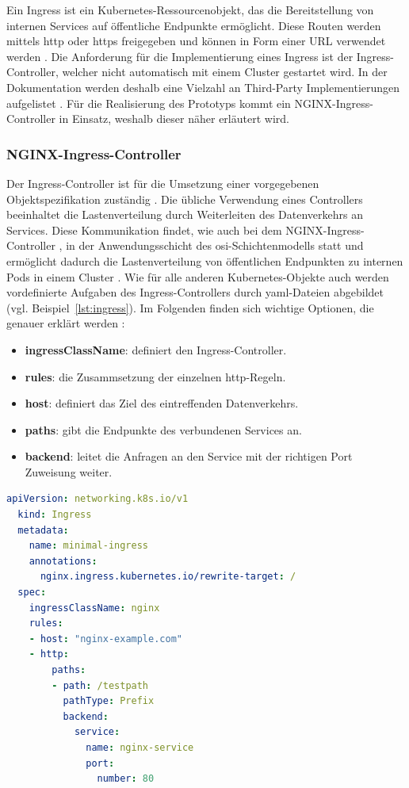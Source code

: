 Ein Ingress ist ein Kubernetes-Ressourcenobjekt, das die Bereitstellung von internen Services auf öffentliche Endpunkte ermöglicht.
Diese Routen werden mittels \acs{http} oder \acs{https} freigegeben und können in Form einer URL verwendet werden \cite{kubernetesingress}.
Die Anforderung für die Implementierung eines Ingress ist der Ingress-Controller, welcher nicht automatisch mit einem Cluster gestartet wird. 
In der Dokumentation werden deshalb eine Vielzahl an Third-Party Implementierungen aufgelistet \cite{kubernetesingresscontroller}. 
Für die Realisierung des Prototyps kommt ein NGINX-Ingress-Controller in Einsatz, weshalb dieser näher erläutert wird.

\subsubsection{NGINX-Ingress-Controller}
Der Ingress-Controller ist für die Umsetzung einer vorgegebenen Objektspezifikation zuständig \cite{kubernetesingress}.
Die übliche Verwendung eines Controllers beeinhaltet die Lastenverteilung durch Weiterleiten des Datenverkehrs an Services. 
Diese Kommunikation findet, wie auch bei dem NGINX-Ingress-Controller \cite{kubernetesingresscontrollerlayer}, in der Anwendungsschicht des \acs{osi}-Schichtenmodells statt und ermöglicht dadurch die 
Lastenverteilung von öffentlichen Endpunkten zu internen Pods in einem Cluster \cite{kubernetesingressibm}.
Wie für alle anderen Kubernetes-Objekte auch werden vordefinierte Aufgaben des Ingress-Controllers durch \acs{yaml}-Dateien abgebildet (vgl. Beispiel~\ref{lst:ingress}).
Im Folgenden finden sich wichtige Optionen, die genauer erklärt werden \cite{kubernetesingress}:

\begin{itemize}
  \item \textbf{ingressClassName}: definiert den Ingress-Controller.
  \item \textbf{rules}: die Zusammsetzung der einzelnen \acs{http}-Regeln.
  \item \textbf{host}: definiert das Ziel des eintreffenden Datenverkehrs.
  \item \textbf{paths}: gibt die Endpunkte des verbundenen Services an.
  \item \textbf{backend}: leitet die Anfragen an den Service mit der richtigen Port Zuweisung weiter.
\end{itemize}

\begin{lstlisting}[caption={ingress.yaml \cite{kubernetesingress} },captionpos=b,label={lst:ingress},language=yaml]
  apiVersion: networking.k8s.io/v1
  kind: Ingress
  metadata:
    name: minimal-ingress
    annotations:
      nginx.ingress.kubernetes.io/rewrite-target: /
  spec:
    ingressClassName: nginx
    rules:
    - host: "nginx-example.com"
    - http:
        paths:
        - path: /testpath
          pathType: Prefix
          backend:
            service:
              name: nginx-service
              port:
                number: 80
\end{lstlisting}
